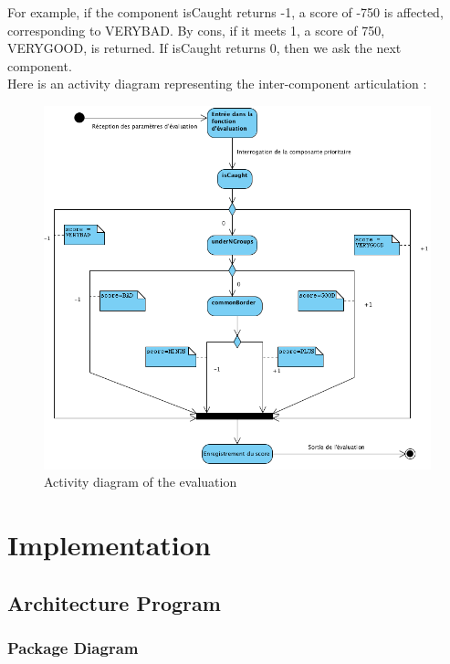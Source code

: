 \documentclass[11pt,a4paper]{report}
\begin{document}
For example, if the component isCaught returns -1, a score of -750 is affected, corresponding to VERYBAD. By cons, if it meets 1, a score of 750, VERYGOOD, is returned. If isCaught returns 0, then we ask the next component.\\



Here is an activity diagram representing the inter-component articulation :

\begin{figure}[h]
\centering
\includegraphics[width=1\textwidth]{activity_diagram.png}
\caption{Activity diagram of the evaluation}
\label{activity_diagram}
\end{figure}

\chapter*{Implementation}

\section{Architecture Program}

\subsection{Package Diagram}
\end{document}
